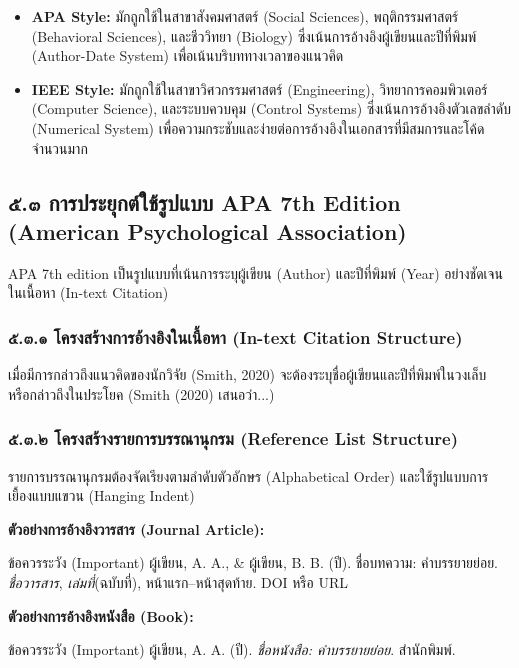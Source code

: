\documentclass[11pt,a4paper,openany]{report}
\begin{document}
\begin{itemize}
  \item \textbf{APA Style:} มักถูกใช้ในสาขาสังคมศาสตร์ (Social Sciences), พฤติกรรมศาสตร์ (Behavioral Sciences), และชีววิทยา (Biology) ซึ่งเน้นการอ้างอิงผู้เขียนและปีที่พิมพ์ (Author-Date System) เพื่อเน้นบริบททางเวลาของแนวคิด
  \item \textbf{IEEE Style:} มักถูกใช้ในสาขาวิศวกรรมศาสตร์ (Engineering), วิทยาการคอมพิวเตอร์ (Computer Science), และระบบควบคุม (Control Systems) ซึ่งเน้นการอ้างอิงตัวเลขลำดับ (Numerical System) เพื่อความกระชับและง่ายต่อการอ้างอิงในเอกสารที่มีสมการและโค้ดจำนวนมาก
\end{itemize}


\subsection{๕.๓ การประยุกต์ใช้รูปแบบ APA 7th Edition (American Psychological Association)}


APA 7th edition เป็นรูปแบบที่เน้นการระบุผู้เขียน (Author) และปีที่พิมพ์ (Year) อย่างชัดเจนในเนื้อหา (In-text Citation)

\subsubsection{๕.๓.๑ โครงสร้างการอ้างอิงในเนื้อหา (In-text Citation Structure)}


เมื่อมีการกล่าวถึงแนวคิดของนักวิจัย (Smith, 2020) จะต้องระบุชื่อผู้เขียนและปีที่พิมพ์ในวงเล็บ หรือกล่าวถึงในประโยค (Smith (2020) เสนอว่า...)

\subsubsection{๕.๓.๒ โครงสร้างรายการบรรณานุกรม (Reference List Structure)}


รายการบรรณานุกรมต้องจัดเรียงตามลำดับตัวอักษร (Alphabetical Order) และใช้รูปแบบการเยื้องแบบแขวน (Hanging Indent)

\textbf{ตัวอย่างการอ้างอิงวารสาร (Journal Article):}
\begin{importantbox}{ข้อควรระวัง (Important)}
ผู้เขียน, A. A., \& ผู้เขียน, B. B. (ปี). ชื่อบทความ: คำบรรยายย่อย. \textit{ชื่อวารสาร}, \textit{เล่มที่}(ฉบับที่), หน้าแรก–หน้าสุดท้าย. DOI หรือ URL \\
\end{importantbox}


\textbf{ตัวอย่างการอ้างอิงหนังสือ (Book):}
\begin{importantbox}{ข้อควรระวัง (Important)}
ผู้เขียน, A. A. (ปี). \textit{ชื่อหนังสือ: คำบรรยายย่อย}. สำนักพิมพ์. \\
\end{importantbox}
\end{document}
